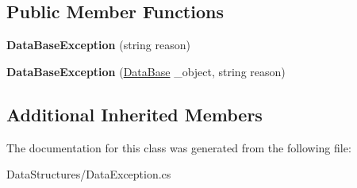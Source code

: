 \subsection*{Public Member Functions}
\begin{DoxyCompactItemize}
\item 
\hypertarget{class_dwarf_d_b_1_1_data_structures_1_1_data_base_exception_ac31189f613083b06927c5b7b62a5415a}{{\bfseries Data\+Base\+Exception} (string reason)}\label{class_dwarf_d_b_1_1_data_structures_1_1_data_base_exception_ac31189f613083b06927c5b7b62a5415a}

\item 
\hypertarget{class_dwarf_d_b_1_1_data_structures_1_1_data_base_exception_a92e1a400cd2702fd38385c374478981e}{{\bfseries Data\+Base\+Exception} (\hyperlink{class_dwarf_d_b_1_1_data_structures_1_1_data_base}{Data\+Base} \+\_\+object, string reason)}\label{class_dwarf_d_b_1_1_data_structures_1_1_data_base_exception_a92e1a400cd2702fd38385c374478981e}

\end{DoxyCompactItemize}
\subsection*{Additional Inherited Members}


The documentation for this class was generated from the following file\+:\begin{DoxyCompactItemize}
\item 
Data\+Structures/Data\+Exception.\+cs\end{DoxyCompactItemize}
